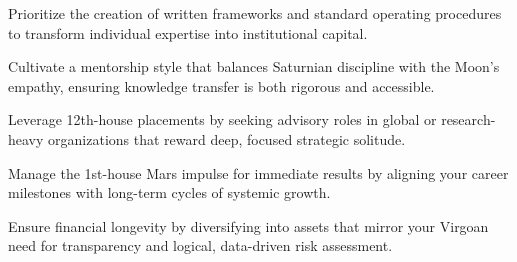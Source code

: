 \begin{diamondlist}
  \item {\fontsize{8.5}{12}\selectfont Prioritize the creation of written frameworks and standard operating procedures to transform individual expertise into institutional capital.}
  \item {\fontsize{8.5}{12}\selectfont Cultivate a mentorship style that balances Saturnian discipline with the Moon's empathy, ensuring knowledge transfer is both rigorous and accessible.}
  \item {\fontsize{8.5}{12}\selectfont Leverage 12th-house placements by seeking advisory roles in global or research-heavy organizations that reward deep, focused strategic solitude.}
  \item {\fontsize{8.5}{12}\selectfont Manage the 1st-house Mars impulse for immediate results by aligning your career milestones with long-term cycles of systemic growth.}
  \item {\fontsize{8.5}{12}\selectfont Ensure financial longevity by diversifying into assets that mirror your Virgoan need for transparency and logical, data-driven risk assessment.}
\end{diamondlist}


